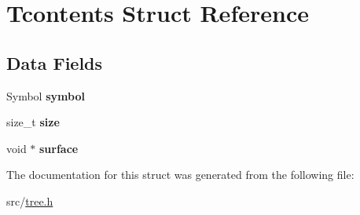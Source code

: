 \hypertarget{structTcontents}{\section{Tcontents Struct Reference}
\label{structTcontents}
}
\subsection*{Data Fields}
\begin{DoxyCompactItemize}
\item 
\hypertarget{structTcontents_a358834f4049b7737235d0121e9452207}{Symbol {\bfseries symbol}}\label{structTcontents_a358834f4049b7737235d0121e9452207}

\item 
\hypertarget{structTcontents_acbf1a70ae5ce196d5872ad16140c9cfd}{size\+\_\+t {\bfseries size}}\label{structTcontents_acbf1a70ae5ce196d5872ad16140c9cfd}

\item 
\hypertarget{structTcontents_a665ef0d569699c8b98a380b190d24834}{void $\ast$ {\bfseries surface}}\label{structTcontents_a665ef0d569699c8b98a380b190d24834}

\end{DoxyCompactItemize}


The documentation for this struct was generated from the following file\+:\begin{DoxyCompactItemize}
\item 
src/\hyperlink{tree_8h}{tree.\+h}\end{DoxyCompactItemize}
